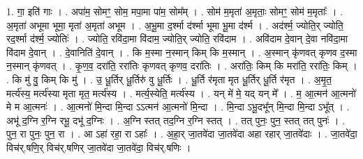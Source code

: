 \documentclass[17pt]{extarticle}
\begin{document}
1. गा॒ इति॑ गाः । . अपा॑म॒ सोमꣳ॒॒ सोम॒ मपा॒मा पा॑म॒ सोम᳚म् । . सोम॑ म॒मृता॑ अ॒मृताः॒ सोमꣳ॒॒ सोम॑ म॒मृताः᳚ । . अ॒मृता॑ अभूमा भूमा॒ मृता॑ अ॒मृता॑ अभूम । . अ॒भू॒मा द॒र्श्मा द॑र्श्मा भूमा भू॒मा द॑र्श्म । . अद॑र्श्म॒ ज्योति॒र् ज्योति॒ रद॒र्श्मा द॑र्श्म॒ ज्योतिः॑ । . ज्योति॒ रवि॑दा॒मा वि॑दाम॒ ज्योति॒र् ज्योति॒ रवि॑दाम । . अवि॑दाम दे॒वान् दे॒वा नवि॑दा॒मा वि॑दाम दे॒वान् । . दे॒वानिति॑ दे॒वान् । . कि म॒स्मा न॒स्मान् किम् कि म॒स्मान् । . अ॒स्मान् कृ॑णवत् कृणव द॒स्मा न॒स्मान् कृ॑णवत् । . कृ॒ण॒व॒ दरा॑ति॒ ररा॑तिः कृणवत् कृणव॒ दरा॑तिः । . अरा॑तिः॒ किम् कि मरा॑ति॒ ररा॑तिः॒ किम् । . कि मु॑ वु॒ किम् कि मु॑ । . उ॒ धू॒र्तिर् धू॒र्तिरु॑ वु धू॒र्तिः । . धू॒र्ति र॑मृता मृत धू॒र्तिर् धू॒र्ति र॑मृत । . अ॒मृ॒त॒ मर्त्य॑स्य॒ मर्त्य॑स्या मृता मृत॒ मर्त्य॑स्य । . मर्त्य॒स्येति॒ मर्त्य॑स्य । . यन् मे॑ मे॒ यद् यन् मे᳚ । . म॒ आ॒त्मन॑ आ॒त्मनो॑ मे म आ॒त्मनः॑ । . आ॒त्मनो॑ मि॒न्दा मि॒न्दा ऽऽत्मन॑ आ॒त्मनो॑ मि॒न्दा । . मि॒न्दा ऽभू॒दभू᳚न् मि॒न्दा मि॒न्दा ऽभू᳚त् । . अभू॑ द॒ग्नि र॒ग्नि रभू॒ दभू॑ द॒ग्निः । . अ॒ग्नि स्तत् तद॒ग्नि र॒ग्नि स्तत् । . तत् पुनः॒ पुन॒ स्तत् तत् पुनः॑ । . पुन॒ रा पुनः॒ पुन॒ रा । . आ ऽहा॑ रहा॒ रा ऽहाः᳚ । . अ॒हा॒र् जा॒तवे॑दा जा॒तवे॑दा अहा रहार् जा॒तवे॑दाः । . जा॒तवे॑दा॒ विच॑र्.षणि॒र् विच॑र्.षणिर् जा॒तवे॑दा जा॒तवे॑दा॒ विच॑र्.षणिः । \newline
\end{document}
